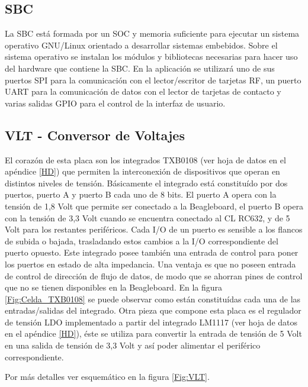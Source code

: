 \subsection{SBC}
La SBC está formada por un SOC y memoria suficiente para ejecutar un sistema operativo GNU/Linux orientado a desarrollar sistemas embebidos. Sobre el sistema operativo se instalan los módulos y bibliotecas necesarias para hacer uso del hardware que contiene la SBC. En la aplicación se utilizará uno de sus puertos SPI para la comunicación con el lector/escritor de tarjetas RF, un puerto UART para la comunicación de datos con el lector de tarjetas de contacto y varias salidas GPIO para el control de la interfaz de usuario.

\subsection{VLT - Conversor de Voltajes}
El corazón de esta placa son los integrados TXB0108 \cite{HD_VLT} (ver hoja de datos en el apéndice \ref{HD}) que permiten la interconexión de dispositivos que operan en distintos niveles de tensión. Básicamente el integrado está constituído por dos puertos, puerto A y puerto B cada uno de 8 bits. El puerto A opera con la tensión de 1,8 Volt que permite ser conectado a la Beagleboard, el puerto B opera con la tensión de 3,3 Volt cuando se encuentra conectado al CL RC632, y de 5 Volt para los restantes periféricos.
Cada I/O de un puerto es sensible a los flancos de subida o bajada, trasladando estos cambios a la I/O correspondiente del puerto opuesto. 
Este integrado posee también una entrada de control para poner los puertos en estado de alta impedancia.
Una ventaja es que no poseen entrada de control de dirección de flujo de datos, de modo que se ahorran pines de control que no se tienen disponibles en la Beagleboard.
En la figura \ref{Fig:Celda_TXB0108} se puede observar como están constituídas cada una de las entradas/salidas del integrado.
Otra pieza que compone esta placa es el regulador de tensión LDO implementado a partir del integrado LM1117 \cite{LDO} (ver hoja de datos en el apéndice \ref{HD}), éste se utiliza para convertir la entrada de tensión de 5 Volt en una salida de tensión de 3,3 Volt y así poder alimentar el periférico correspondiente.

Por más detalles ver esquemático en la figura \ref{Fig:VLT}.

